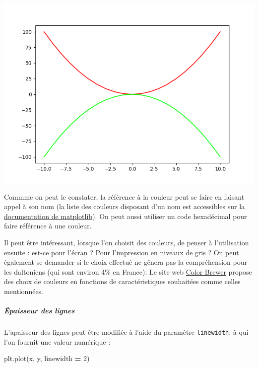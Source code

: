 \documentclass[12pt,]{book}
\newenvironment{Shaded}{\begin{snugshade}}{\end{snugshade}}
\newcommand{\DecValTok}[1]{\textcolor[rgb]{0.00,0.00,0.81}{#1}}
\newcommand{\OperatorTok}[1]{\textcolor[rgb]{0.81,0.36,0.00}{\textbf{#1}}}
\newcommand{\NormalTok}[1]{#1}
\let\oldsubparagraph\subparagraph
\renewcommand{\subparagraph}[1]{\oldsubparagraph{#1}\mbox{}}
\numberwithin{equation}{section}
\numberwithin{countremarque}{section}
\let\BeginKnitrBlock\begin \let\EndKnitrBlock\end
\begin{document}
\begin{center}\includegraphics[width=9.03in]{figs/pyplot/lignes_couleur} \end{center}

Commme on peut le constater, la référence à la couleur peut se faire en
faisant appel à son nom (la liste des couleurs disposant d'un nom est
accessibles sur la
\href{https://matplotlib.org/examples/color/named_colors.html}{documentation
de matplotlib}). On peut aussi utiliser un code hexadécimal pour faire
référence à une couleur.

\BeginKnitrBlock{remarque}
Il peut être intéressant, lorsque l'on choisit des couleurs, de penser à
l'utilisation ensuite : est-ce pour l'écran ? Pour l'impression en
niveaux de gris ? On peut également se demander si le choix effectué ne
gênera pas la compréhension pour les daltoniens (qui sont environ 4\% en
France). Le site web \href{http://colorbrewer2.org/}{Color Brewer}
propose des choix de couleurs en fonctions de caractéristiques
souhaitées comme celles mentionnées.
\EndKnitrBlock{remarque}

\subparagraph{Épaisseur des lignes}\label{epaisseur-des-lignes}

L'apaisseur des lignes peut être modifiée à l'aide du paramètre
\texttt{linewidth}, à qui l'on fournit une valeur numérique :

\begin{Shaded}
\begin{Highlighting}[]
\NormalTok{plt.plot(x, y, linewidth }\OperatorTok{=} \DecValTok{2}\NormalTok{)}
\end{Highlighting}
\end{Shaded}
\end{document}
